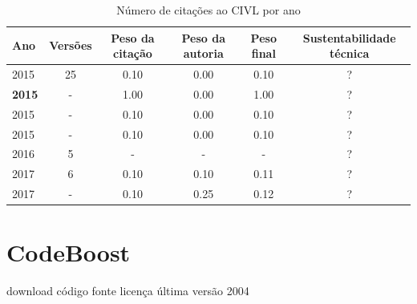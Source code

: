 \begin{table}[H]
\caption{Número de citações ao CIVL  por ano}
\centering
\begin{tabular}{| l | c | c | c | c | c |}
  \hline
  Ano & Versões & Peso da citação & Peso da autoria & Peso final & Sustentabilidade técnica \\
  \hline
            2015
          &
          25
          &
          0.10
          &
          0.00
          &
            {\color{red} 0.10}
          &
          ?
          \\
            {\bf 2015}
          &
          -
          &
          1.00
          &
          0.00
          &
            {\color{blue} 1.00}
          &
          ?
          \\
            2015
          &
          -
          &
          0.10
          &
          0.00
          &
            {\color{red} 0.10}
          &
          ?
          \\
            2015
          &
          -
          &
          0.10
          &
          0.00
          &
            {\color{red} 0.10}
          &
          ?
          \\
\hline
        2016 & 5 & - & - & - & ? \\
\hline
            2017
          &
          6
          &
          0.10
          &
          0.10
          &
            {\color{red} 0.11}
          &
          ?
          \\
            2017
          &
          -
          &
          0.10
          &
          0.25
          &
            {\color{red} 0.12}
          &
          ?
          \\
\hline
\end{tabular}
\end{table}



\section{CodeBoost}
\checkmark download
\checkmark código fonte
\checkmark licença
\checkmark última versão 2004



